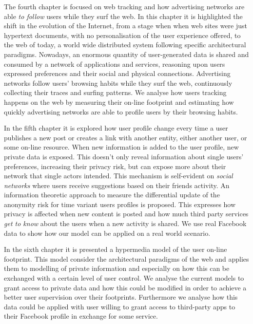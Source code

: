 The fourth chapter is focused on web tracking and how advertising networks are able \emph{to follow} users while they surf the web. In this chapter it is highlighted the shift in the evolution of the Internet, from a stage when when web sites were just hypertext documents, with no personalisation of the user experience offered, to the web of today, a world wide distributed system following specific architectural paradigms. Nowadays, an enormous quantity of user-generated data is shared and consumed by a network of applications and services, reasoning upon users expressed preferences and their social and physical connections. Advertising networks follow users’ browsing habits while they surf the web, continuously collecting their traces and surfing patterns. We analyse how users tracking happens on the web by measuring their on-line footprint and estimating how quickly advertising networks are able to profile users by their browsing habits.

In the fifth chapter it is explored how user profile change every time a user publishes a new post or creates a link with another entity, either another user, or some on-line resource. When new information is added to the user profile, new private data is exposed. This doesn't only reveal information about single users' preferences, increasing their privacy risk, but can expose more about their network that single actors intended. This mechanism is self-evident on \emph{social networks} where users receive suggestions based on their friends activity. An information theoretic approach to measure the differential update of the anonymity risk for time variant users profiles is proposed. This expresses how privacy is affected when new content is posted and how much third party services \emph{get to know} about the users when a new activity is shared. We use real Facebook data to show how our model can be applied on a real world scenario.

In the sixth chapter it is presented a hypermedia model of the user on-line footprint. This model consider the architectural paradigms of the web and applies them to modelling of private information and especially on how this can be exchanged with a certain level of user control. We analyse the current models to grant access to private data and how this could be modified in order to achieve a better user supervision over their footprints. Furthermore we analyse how this data could be applied with user willing to grant access to third-party apps to their Facebook profile in exchange for some service.


